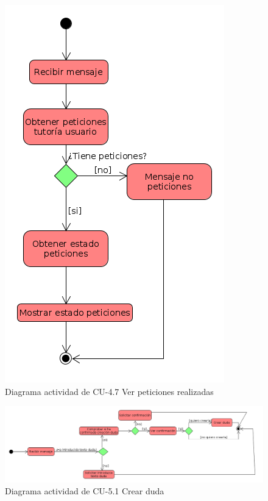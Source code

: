         \begin{figure}[H] %
\centering
\includegraphics[scale=0.5]{imagenes/diagramas/actividad/ver_peticiones_realizadass.png}  %

\caption{Diagrama actividad de CU-4.7 Ver peticiones realizadas}\label{figura147}
\end{figure}

        \begin{figure}[H] %
\centering
\includegraphics[scale=0.3]{imagenes/diagramas/actividad/crear_duda.png}  %

\caption{Diagrama actividad de CU-5.1 Crear duda}\label{figura148}
\end{figure}

